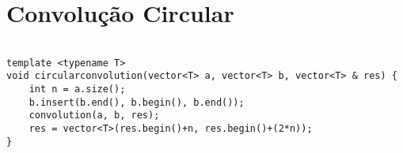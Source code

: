 \section{Convolução Circular}

	\begin{lstlisting}

template <typename T>
void circularconvolution(vector<T> a, vector<T> b, vector<T> & res) {
	int n = a.size();
	b.insert(b.end(), b.begin(), b.end());
	convolution(a, b, res);
	res = vector<T>(res.begin()+n, res.begin()+(2*n));
}

\end{lstlisting}

